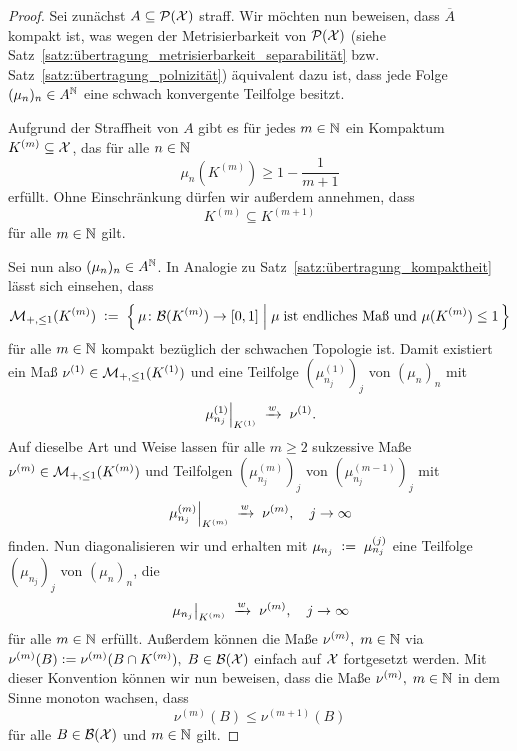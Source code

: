 \documentclass[../thesis/thesis.tex]{subfiles}
\begin{document}
	\begin{proof}
		Sei zunächst $A \subseteq \mathcal{P}(\mathcal{X})$ straff. Wir möchten nun beweisen, dass $\overline{A}$ 
		kompakt ist, was wegen der Metrisierbarkeit von $\mathcal{P}(\mathcal{X})$ (siehe Satz~\ref{satz:übertragung_metrisierbarkeit_separabilität} bzw. Satz~\ref{satz:übertragung_polnizität}) äquivalent dazu ist,
		dass jede Folge $(\mu_n)_n \in A^{\mathbb{N}}$ eine schwach konvergente Teilfolge besitzt. 
		
		Aufgrund der Straffheit von $A$ gibt es für jedes $m \in \mathbb{N}$ ein Kompaktum $K^{(m)} \subseteq \mathcal{X}$, 
		das für alle $n \in \mathbb{N}$
		\[ \mu_n(K^{(m)}) \geq 1 - \frac{1}{m+1} \label{glg:5.2} \tag{5.2} \]
		erfüllt. Ohne Einschränkung dürfen wir außerdem annehmen, dass 
		\[ K^{(m)} \subseteq K^{(m+1)} \label{glg:5.3} \tag{5.3} \] 
		für alle $m \in \mathbb{N}$ gilt.
		
		Sei nun also $(\mu_n)_n \in A^{\mathbb{N}}$.
		In Analogie zu Satz~\ref{satz:übertragung_kompaktheit} lässt sich einsehen, dass 
		\[ \mathcal{M}_{+,\leq 1}(K^{(m)}) \; \vcentcolon = \; \left\{\, \mu \colon \mathcal{B}(K^{(m)}) \to [0,1] \; \middle| \; \mu \; 
			\text{ist endliches Maß und } \mu(K^{(m)}) \leq 1 \,\right\} \]
		für alle $m \in \mathbb{N}$ kompakt bezüglich der schwachen Topologie ist. Damit existiert ein Maß 
		$\nu^{(1)} \in \mathcal{M}_{+,\leq 1}(K^{(1)})$ und eine Teilfolge $(\mu_{n_j}^{(1)})_j$ von $(\mu_n)_n$ mit
		\[ \left.\mu_{n_j}^{(1)}\right|_{K^{(1)}} \; \xrightarrow{w} \; \nu^{(1)} \text{.} \]
		Auf dieselbe Art und Weise lassen für alle $m\geq 2$ sukzessive Maße 
		$\nu^{(m)} \in \mathcal{M}_{+,\leq 1}(K^{(m)})$ und Teilfolgen $(\mu_{n_j}^{(m)})_j$ von $(\mu_{n_j}^{(m-1)})_j$ mit
		\[ \left.\mu_{n_j}^{(m)}\right|_{K^{(m)}} \; \xrightarrow{w} \; \nu^{(m)}, \quad j \to \infty \]
		finden.
		Nun diagonalisieren wir und erhalten mit $\mu_{n_j} \; \vcentcolon = \; \mu_{n_j}^{(j)}$ eine Teilfolge 
		$(\mu_{n_j})_j$ von $(\mu_n)_n$, die
		\[ \left.\mu_{n_j}\right|_{K^{(m)}} \; \xrightarrow{w} \; \nu^{(m)}, \quad j \to \infty \]
		für alle $m \in \mathbb{N}$ erfüllt.
		Außerdem können die Maße $\nu^{(m)}, \; m \in \mathbb{N}$ via 
		$\nu^{(m)}(B) \vcentcolon = \nu^{(m)}(B \cap K^{(m)}), \; B \in \mathcal{B}(\mathcal{X})$ einfach auf $\mathcal{X}$ fortgesetzt werden. 
		Mit dieser Konvention können wir nun beweisen, dass die Maße
		$\nu^{(m)}, \; m \in \mathbb{N}$ in dem Sinne monoton wachsen, dass 
		\[ \nu^{(m)}(B) \leq \nu^{(m+1)}(B) \label{glg:5.4} \tag{5.4} \]
		für alle $B \in \mathcal{B}(\mathcal{X})$ und $m \in \mathbb{N}$ gilt.
		

\end{proof}
\end{document}
